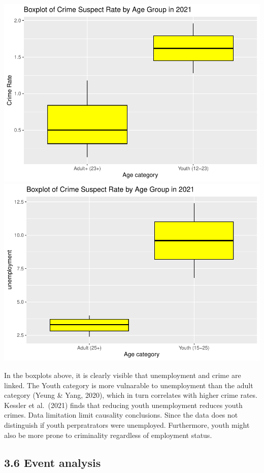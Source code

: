 \documentclass[
]{article}
\begin{document}
\includegraphics[width=0.48\linewidth]{Template_Assignment_files/figure-latex/visualise_subpopulations-1}
\includegraphics[width=0.48\linewidth]{Template_Assignment_files/figure-latex/visualise_subpopulations-2}

In the boxplots above, it is clearly visible that unemployment and crime
are linked. The Youth category is more vulnarable to unemployment than
the adult category (Yeung \& Yang, 2020), which in turn correlates with
higher crime rates. Kessler et al.~(2021) finds that reducing youth
unemployment reduces youth crimes. Data limitation limit causality
conclusions. Since the data does not distinguish if youth perpratrators
were unemployed. Furthermore, youth might also be more prone to
criminality regardless of employment status.

\subsection{3.6 Event analysis}\label{event-analysis}
\end{document}
